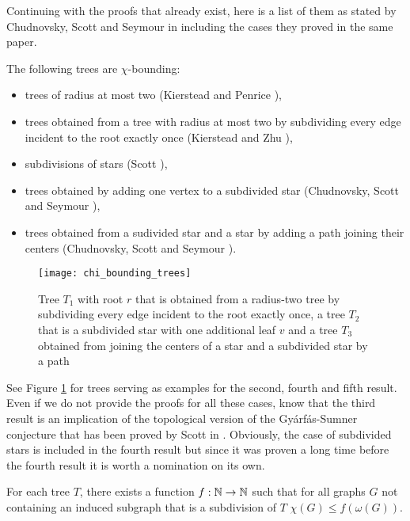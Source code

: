 Continuing with the proofs that already exist, here is a list of them as stated by Chudnovsky, Scott and Seymour in \cite{CSS17} including the cases they proved in the same paper.

\begin{thm}\label{t3cr}
The following trees are $\chi$-bounding:
\begin{itemize}
\item trees of radius at most two (Kierstead and Penrice \cite{Ki94}),
\item trees obtained from a tree with radius at most two by subdividing every edge incident to the root exactly once (Kierstead and Zhu \cite{Ki04}),
\item subdivisions of stars (Scott \cite{Sc97}),
\item trees obtained by adding one vertex to a subdivided star (Chudnovsky, Scott and Seymour \cite{CSS17}),
\item trees obtained from a sudivided star and a star by adding a path joining their centers (Chudnovsky, Scott and Seymour \cite{CSS17}).
\end{itemize} 
\end{thm}

\begin{figure}[ht]
\begin{center}
\texttt{[image: chi\_bounding\_trees]}
\end{center}
\caption{Tree $T_1$ with root $r$ that is obtained from a radius-two tree by subdividing every edge incident to the root exactly once, a tree $T_2$ that is a subdivided star with one additional leaf $v$ and a tree $T_3$ obtained from joining the centers of a star and a subdivided star by a path}
\label{f2cr}
\end{figure}

See Figure \ref{f2cr} for trees serving as examples for the second, fourth and fifth result. Even if we do not provide the proofs for all these cases, know that the third result is an implication of the topological version of the Gyárfás-Sumner conjecture that has been proved by Scott in \cite{Sc97}. Obviously, the case of subdivided stars is included in the fourth result but since it was proven a long time before the fourth result it is worth a nomination on its own.

\begin{thm}
For each tree $T$, there exists a function $f:\mathbb{N}\to\mathbb{N}$ such that for all graphs $G$ not containing an induced subgraph that is a subdivision of $T$ $\chi (G)\leq f(\omega (G))$.
\end{thm}

